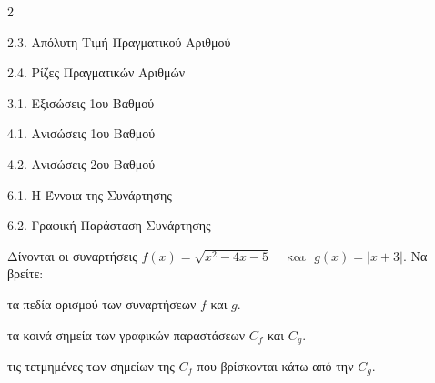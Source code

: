 \begin{ylh}{2}
    \item 2.3. Απόλυτη Τιμή Πραγματικού Αριθμού
    \item 2.4. Ρίζες Πραγματικών Αριθμών
    \item 3.1. Εξισώσεις 1ου Βαθμού
    \item 4.1. Ανισώσεις 1ου Βαθμού
    \item 4.2. Ανισώσεις 2ου Βαθμού
    \item 6.1. Η Έννοια της Συνάρτησης
    \item 6.2. Γραφική Παράσταση Συνάρτησης
\end{ylh}
Δίνονται οι συναρτήσεις $f(x) = \sqrt{x^{2} - 4x - 5}\ \ \ \ \text{ και}\ \ \ g(x) = |x + 3|.$
Να βρείτε:
\begin{alist}
\item τα πεδία ορισμού των συναρτήσεων $f$ και $g$.
\item τα κοινά σημεία των γραφικών παραστάσεων $C_{f}$ και $C_{g}$.
\item τις τετμημένες των σημείων της $C_{f}$ που βρίσκονται κάτω από την $C_{g}$.
\end{alist}

